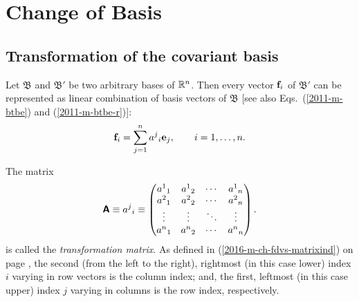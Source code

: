 

\section{Change of Basis}
\label{2016-m-tensor-cob}



\subsection{Transformation of the covariant basis}

Let
${\mathfrak B}$
and
${\mathfrak B'}$
be two arbitrary bases of
${\Bbb R}^n$.
Then every vector ${\bf f}_i$ of
${\mathfrak B'}$
can be represented as linear combination of basis vectors of
${\mathfrak B}$ [see also Eqs.~(\ref{2011-m-btbe}) and (\ref{2011-m-btbe-r})]:
\begin{equation}
{\bf f}_i=\sum_{j=1}^n {a^j}_i {\bf e}_j, \qquad i=1,\ldots , n
.
\label{2001-mu-tensors}
\end{equation}

The matrix
\begin{equation}
\textsf{\textbf{A}}
\equiv {a^j}_i \equiv
\begin{pmatrix}
{a^1}_1&{a^1}_2& \cdots & {a^1}_n\\
{a^2}_1&{a^2}_2& \cdots & {a^2}_n\\
\vdots &\vdots & \ddots & \vdots \\
{a^n}_1&{a^n}_2& \cdots & {a^n}_n
\end{pmatrix}
.
\label{2016-m-ch-tensor-tm}
\end{equation}
is called the {\em transformation matrix}.
As defined in (\ref{2016-m-ch-fdvs-matrixind}) on page \pageref{2016-m-ch-fdvs-matrixind},
the second (from the left to the right), rightmost (in this case lower) index $i$ varying in row vectors is the column index;
and, the first, leftmost (in this case upper) index $j$  varying in columns is the row index, respectively.


